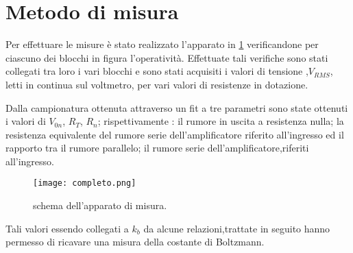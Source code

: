 	
\section{Metodo di misura}	 
	Per effettuare le misure è stato realizzato l'apparato in \figurename{ \ref{fig:completo}}
	verificandone per ciascuno dei blocchi in figura l'operatività.
	Effettuate tali verifiche sono stati collegati tra loro i vari blocchi
	e sono stati acquisiti i valori di tensione ,$V_{RMS}$, letti in continua sul voltmetro, 
	per vari valori di resistenze in dotazione.
	
	Dalla campionatura ottenuta attraverso un fit a tre parametri sono state ottenuti i valori 
	di $V_{0n}$, $R_{T}$, $R_{n}$; rispettivamente : il rumore in uscita a resistenza nulla; la resistenza equivalente del rumore serie dell'amplificatore riferito all'ingresso ed il rapporto tra il rumore parallelo; il rumore serie dell’amplificatore,riferiti all’ingresso.
	
	\begin{figure}[h]
			\centering
			\texttt{[image: completo.png]}
			\caption{schema dell'apparato di misura.}
			\label{fig:completo}
	\end{figure}

	Tali valori essendo collegati a $k_{b}$ da alcune relazioni,trattate in seguito hanno permesso
	di ricavare una misura della costante di Boltzmann. 
	